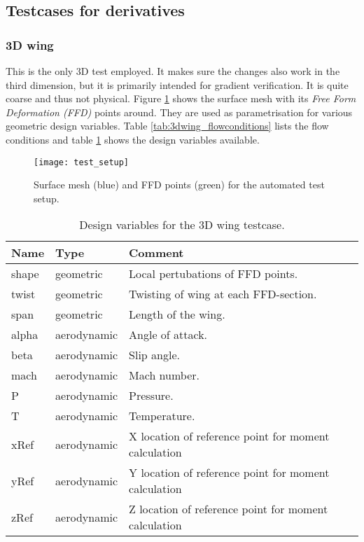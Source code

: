 \subsection{Testcases for derivatives}
\subsubsection{3D wing}
This is the only 3D test employed. It makes sure the changes also work in the
third dimension, but it is primarily intended for gradient verification. It is
quite coarse and thus not physical. Figure \ref{fig:3dwing_setup} shows the
surface mesh with its \textit{Free Form Deformation (FFD)} points around. They
are used as parametrisation for various geometric design variables. Table
\ref{tab:3dwing_flowconditions} lists the flow conditions and table
\ref{tab:3dwing_dvs} shows the design variables available.

\begin{figure}[H] \centering
    \texttt{[image: test\_setup]}
    \caption{Surface mesh (blue) and FFD points (green) for the automated test
    setup. \cite{vt1}}
    \label{fig:3dwing_setup}
\end{figure}

\begin{table}[H]
    \centering
    \begin{tabular}{l l l}
        \toprule
        Name  & Type & Comment \\
        \toprule
        shape   & geometric   & Local pertubations of FFD points. \\
        twist   & geometric   & Twisting of wing at each FFD-section. \\
        span    & geometric   & Length of the wing. \\
        alpha   & aerodynamic & Angle of attack. \\
        beta    & aerodynamic & Slip angle. \\
        mach    & aerodynamic & Mach number. \\
        P       & aerodynamic & Pressure. \\
        T       & aerodynamic & Temperature. \\
        xRef    & aerodynamic & X location of reference point for moment
        calculation \\
        yRef    & aerodynamic & Y location of reference point for moment
        calculation \\
        zRef    & aerodynamic & Z location of reference point for moment
        calculation \\
        \bottomrule
    \end{tabular}
    \caption{Design variables for the 3D wing testcase.\label{tab:3dwing_dvs}}
\end{table}

